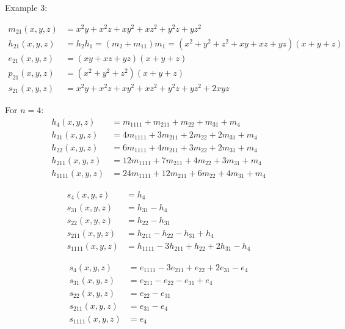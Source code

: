 \documentclass[12pt]{amsart}
\begin{document}
\newpage

\begin{mdframed}[backgroundcolor=green!10]
	\label{exemple bases} %
	\begin{it}Example 3: \end{it}
		\begin{align*}
			m_{21}(x,y,z)&=x^2y+x^2z+xy^2+xz^2+y^2z+yz^2
			  \\  h_{21}(x,y,z)&=h_2h_1=(m_2+m_{11})m_1=(x^2+y^2+z^2+xy+xz+yz)(x+y+z)
			\\ e_{21}(x,y,z)&=(xy+xz+yz)(x+y+z)
			\\ p_{21}(x,y,z)&=(x^2+y^2+z^2)(x+y+z)
 			 \\s_{21}(x,y,z)&=x^2y+x^2z+xy^2+xz^2+y^2z+yz^2+2xyz 
 		 \end{align*}  

		For $n=4$:
		  \begin{align*}
			h_{4}(x,y,z)&=m_{1111} + m_{211} + m_{22} + m_{31} + m_{4}
 			 \\  h_{31}(x,y,z)&=4m_{1111} + 3m_{211} + 2m_{22} + 2m_{31} + m_{4}
			\\ h_{22}(x,y,z)&=6m_{1111} + 4m_{211} + 3m_{22} + 2m_{31} + m_{4}
			\\ h_{211}(x,y,z)&=12m_{1111} + 7m_{211} + 4m_{22} + 3m_{31} + m_{4}
 			 \\h_{1111}(x,y,z)&=24m_{1111} + 12m_{211} + 6m_{22} + 4m_{31} + m_{4}
 		 \end{align*}  
 		 \begin{minipage}[t]{10cm}
 			 \begin{align*}
				s_{4}(x,y,z)&=h_{4} 
 				 \\  s_{31}(x,y,z)&=h_{31} - h_{4}
				\\ s_{22}(x,y,z)&=h_{22} - h_{31}
				\\ s_{211}(x,y,z)&=h_{211} - h_{22} - h_{31} + h_{4}
 				 \\s_{1111}(x,y,z)&=h_{1111} - 3h_{211} + h_{22} + 2h_{31} - h_{4}
 			 \end{align*} 
 		 \end{minipage}
 		 \begin{minipage}[t]{9cm}
 			   \begin{align*}
				s_{4}(x,y,z)&=e_{1111} - 3e_{211} + e_{22} + 2e_{31} - e_{4}
 				 \\  s_{31}(x,y,z)&=e_{211} - e_{22} - e_{31} + e_{4}
				\\ s_{22}(x,y,z)&=e_{22} - e_{31}
				\\ s_{211}(x,y,z)&=e_{31} - e_{4}
 				 \\s_{1111}(x,y,z)&=e_{4}
 			 \end{align*} 
 		  \end{minipage}
   
	\hyperref[retour bases]{}
\end{mdframed}
\end{document}
